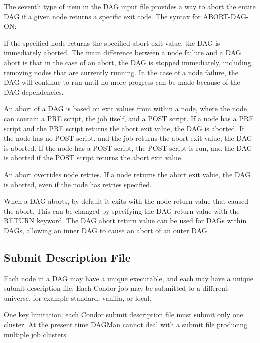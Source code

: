 The seventh type of item in the DAG input file provides a way
to abort the entire DAG if a given node returns a specific exit
code.  The syntax for ABORT-DAG-ON:

  

If the specified node returns the specified abort exit value, the
DAG is immediately aborted.  The main difference between a node
failure and a DAG abort is that
in the case of an abort, the DAG is stopped immediately, including
removing nodes that are currently running.  In the case of a node
failure, the DAG will continue to run until no more progress can
be made because of the DAG dependencies.

An abort of a DAG is based on exit values from
within a node, 
where the node can contain
a PRE script, the job itself, and a POST script.
If a node has a PRE script and the PRE
script returns the abort exit value, the DAG is aborted.
If the node has no POST script,
and the job returns the abort exit value,
the DAG is aborted.
If the node has a POST script,
the POST script is run,
and the DAG is aborted if the POST script returns
the abort exit value.

An abort overrides node retries. 
If a node returns the abort exit value,
the DAG is aborted,
even if the node has retries specified.

When a DAG aborts, by default it exits with the node return value that
caused the abort.  This can be changed by specifying the DAG return
value with the RETURN keyword.
The DAG abort return value
can be used for DAGs within DAGs,
allowing an inner DAG to cause an abort of an outer DAG.

\subsection{Submit Description File}

Each node in a DAG may have a unique executable, and each may have a unique
submit description file.
Each Condor job may be submitted to a different universe,
for example standard,
vanilla, or local.

One key limitation:
each Condor submit description file must submit only one cluster.
At the present time DAGMan cannot deal with a submit file producing
multiple job clusters.

